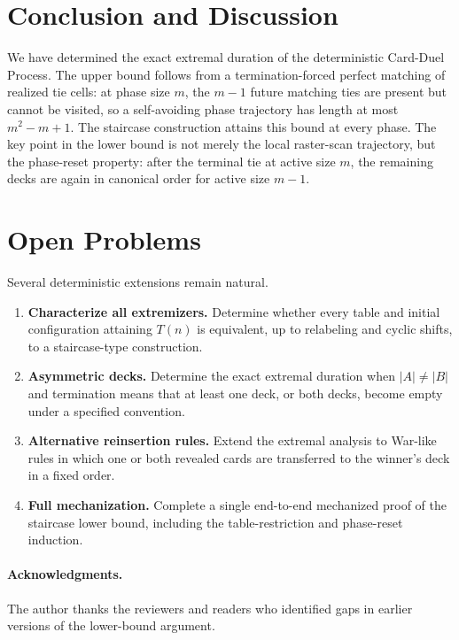 \documentclass[11pt]{article}
\theoremstyle{definition}
\theoremstyle{remark}
\begin{document}
\section{Conclusion and Discussion}
We have determined the exact extremal duration of the deterministic Card-Duel Process. The upper bound follows from a termination-forced perfect matching of realized tie cells: at phase size $m$, the $m-1$ future matching ties are present but cannot be visited, so a self-avoiding phase trajectory has length at most $m^2-m+1$. The staircase construction attains this bound at every phase. The key point in the lower bound is not merely the local raster-scan trajectory, but the phase-reset property: after the terminal tie at active size $m$, the remaining decks are again in canonical order for active size $m-1$.

\section{Open Problems}
Several deterministic extensions remain natural.
\begin{enumerate}[label=\arabic*.]
    \item \textbf{Characterize all extremizers.} Determine whether every table and initial configuration attaining $T(n)$ is equivalent, up to relabeling and cyclic shifts, to a staircase-type construction.
    \item \textbf{Asymmetric decks.} Determine the exact extremal duration when $|A|\ne |B|$ and termination means that at least one deck, or both decks, become empty under a specified convention.
    \item \textbf{Alternative reinsertion rules.} Extend the extremal analysis to War-like rules in which one or both revealed cards are transferred to the winner's deck in a fixed order.
    \item \textbf{Full mechanization.} Complete a single end-to-end mechanized proof of the staircase lower bound, including the table-restriction and phase-reset induction.
\end{enumerate}

\paragraph{Acknowledgments.} The author thanks the reviewers and readers who identified gaps in earlier versions of the lower-bound argument.
\end{document}
